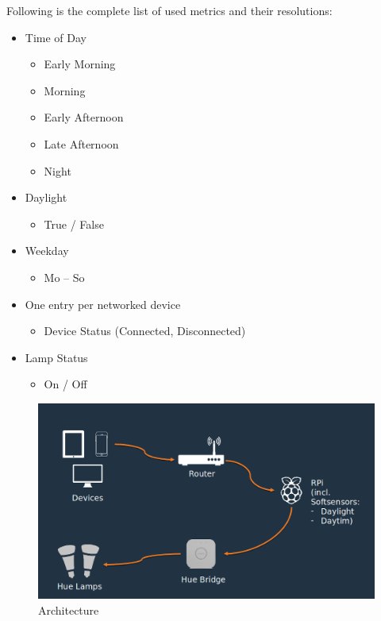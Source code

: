 Following is the complete list of used metrics and their resolutions:

\begin{itemize}
    \item Time of Day
         \begin{itemize}
           \item Early Morning
           \item Morning
           \item Early Afternoon
           \item Late Afternoon
           \item Night
        \end{itemize}      
    \item Daylight
        \begin{itemize}
           \item True / False
        \end{itemize}    
    \item Weekday
     \begin{itemize}
           \item Mo -- So
        \end{itemize}   
    \item One entry per networked device
       \begin{itemize}
           \item Device Status (Connected, Disconnected)
          \end{itemize}
    \item Lamp Status
         \begin{itemize}
           \item On / Off
        \end{itemize}   
\end{itemize}

\begin{figure}
  \centering
    \includegraphics[width=1.0\textwidth]{../../ArchitectureFinal.png}
  \caption{Architecture}
  \label{fig:architecture}
\end{figure}
